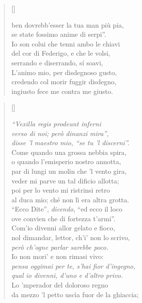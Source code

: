 \documentclass{article}
\begin{document}
\begin{verse}[\versewidth]
\begin{patverse*}
    ben dovrebb'esser la tua man più pia,\\
    se state fossimo anime di serpi''.\\
    Io son colui che tenni ambo le chiavi\\
    del cor di Federigo, e che le volsi,\\
    serrando e diserrando, sí soavi,\\
    L'animo mio, per disdegnoso gusto,\\
    credendo col morir fuggir disdegno,\\
    ingiusto fece me contra me giusto.
  \end{patverse*}
\end{verse}

\begin{verse}[\versewidth]
  \begin{patverse*}
    \emph{``Vexilla regis prodeunt inferni\\
    verso di noi; però dinanzi mira'',\\
    disse 'l maestro mio, ``se tu 'l discerni''.}\\
    Come quando una grossa nebbia spira,\\
    o quando l'emisperio nostro annotta,\\
    par di lungi un molin che 'l vento gira,\\
    veder mi parve un tal dificio allotta;\\
    poi per lo vento mi ristrinsi retro\\
    al duca mio; ché non lì era altra grotta.\\
    ``Ecco Dite'', \emph{dicendo}, ``ed ecco il loco\\
    ove convien che di fortezza t'armi''.\\
    Com'io divenni allor gelato e fioco,\\
    nol dimandar, lettor, ch'i' non lo scrivo,\\
    \emph{però ch'ogne parlar sarebbe poco.}\\
    Io non mori' e non rimasi vivo:\\
    \emph{pensa oggimai per te, s'hai fior d'ingegno,\\
    qual io divenni, d'uno e d'altro privo.}\\
    Lo 'mperador del doloroso regno\\
    da mezzo 'l petto uscìa fuor de la ghiaccia;\\

\end{patverse*}
\end{verse}
\end{document}

